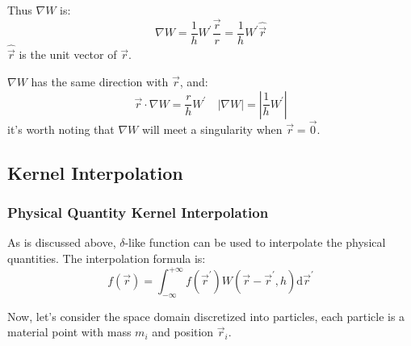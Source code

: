 Thus $\nabla W$ is:
\begin{equation}
    \nabla W = \frac{1}{h} W^\prime \frac{\vec{r}}{r}
    = \frac{1}{h} W^\prime \hat{\vec{r}}
\end{equation}
$\hat{\vec{r}}$ is the unit vector of $\vec{r}$.

$\nabla W$ has the same direction with $\vec{r}$, and:
\begin{equation}
    \vec{r}\cdot \nabla W = \frac{r}{h} W^\prime\quad
    |\nabla W| = \left|\frac{1}{h} W^\prime\right|
\end{equation}
it's worth noting that $\nabla{W}$ will meet a singularity when $\vec{r}=\vec{0}$.

\subsection{Kernel Interpolation}

\subsubsection{Physical Quantity Kernel Interpolation}

As is discussed above, 
$\delta$-like function can be used to interpolate the physical quantities.
The interpolation formula is:
\begin{equation}
    f(\vec{r}) = \int_{-\infty}^{+\infty} f(\vec{r}^\prime) W(\vec{r} - \vec{r}^\prime,h)\mathrm{d}\vec{r}^\prime
\end{equation}

Now, let's consider the space domain discretized into particles, 
each particle is a material point with mass $m_i$ and position $\vec{r}_i$.

\begin{figure}[H]
    \centering
\end{figure}

